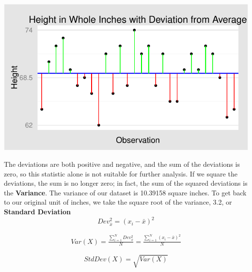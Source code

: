 \documentclass[nohyper,justified]{tufte-handout}\usepackage[]{graphicx}\usepackage[]{color}
\makeatletter
\def\maxwidth{ %
  \ifdim\Gin@nat@width>\linewidth
    \linewidth
  \else
    \Gin@nat@width
  \fi
}
\newenvironment{knitrout}{}{} %
\makeatother
\begin{document}
\begin{knitrout}
\color{fgcolor}

{\centering \includegraphics[width=\maxwidth]{figure/graphics-mean-center-chart-1} 

}



\end{knitrout}

The deviations are both positive and negative, and the sum of the deviations is zero, so this statistic alone is not suitable for further analysis. If we square the deviations, the sum is no longer zero; in fact, the sum of the squared deviations is the \textbf{Variance}. The variance of our dataset is 10.39158 square inches. To get back to our original unit of inches, we take the square root of the variance, 3.2, or \textbf{Standard Deviation}
\begin{equation*}
Dev_{\bar{x}}^2=(x_i-\bar{x})^2 
\end{equation*}

\begin{multline*}
Var(X)=\frac{\sum_{i=1}^{N} Dev_{\bar{x}}^2}{N}=\frac{\sum_{i=1}^{N} (x_i-\bar{x})^2}{N}
\end{multline*}

\begin{equation*}
StdDev(X)=\sqrt{Var(X)} 
\end{equation*}
\end{document}
